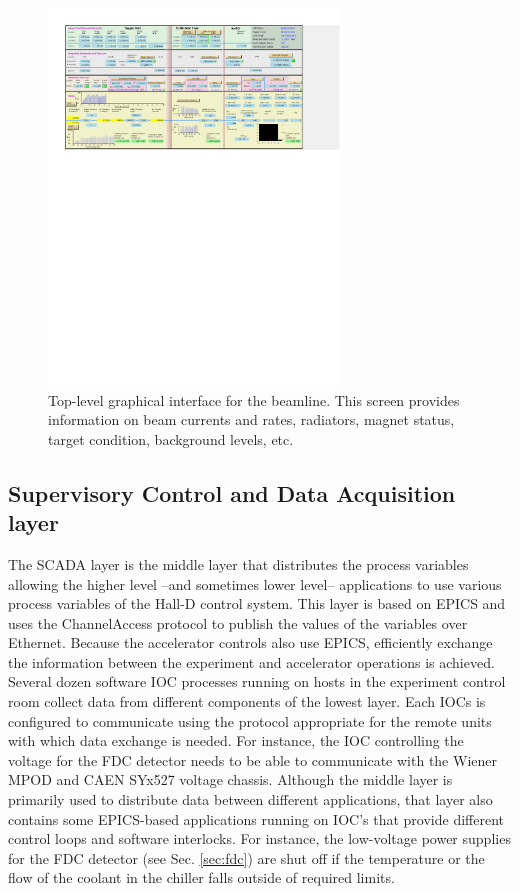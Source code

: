 \begin{landscape}
 \begin{figure}[tbp]
\begin{center}
\includegraphics[height=10cm,bb=35 480 535 760,clip=true]{figures/GlueX_CSS_overview.pdf}
\caption{Top-level graphical interface for the beamline. This screen provides information on beam currents and rates, radiators, magnet status, target condition, background levels, etc.
\label{fig:GlueX_CSS_overview}
}
\end{center}
\end{figure}
\end{landscape}

\subsection{Supervisory Control and Data Acquisition layer \label{sec:archiver}}
The SCADA layer is the middle layer that distributes the process variables allowing the higher level --and sometimes lower level-- applications to use various process variables of the Hall-D control system. This layer is based on EPICS and uses the ChannelAccess protocol to publish the values of the variables over Ethernet. Because the accelerator controls also use EPICS, efficiently exchange the information between the experiment and accelerator operations is achieved. Several dozen software IOC processes running on hosts in the experiment control room collect data from different components of the lowest layer. Each IOCs is configured to communicate using the protocol appropriate for the remote units with which data exchange is needed. For instance, the IOC controlling the voltage for the FDC detector needs to be able to communicate with the Wiener MPOD and CAEN SYx527 voltage chassis. Although the middle layer is primarily used to distribute data between different applications, that layer also contains some EPICS-based applications running on IOC's that provide different control loops and software interlocks.  For instance, the low-voltage power supplies for the FDC detector (see Sec. \ref{sec:fdc}) are shut off if the temperature or the flow of the coolant in the chiller falls outside of required limits. 
